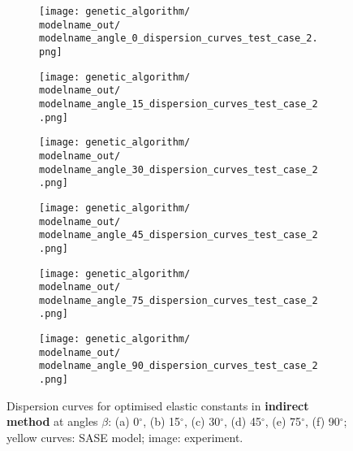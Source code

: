 \documentclass[preprint,12pt]{elsarticle}
\begin{document}
\begin{figure} [h!]
	\newcommand{\modelname}{ga_plain_weave_known_mass}
	\centering
	\begin{subfigure}[b]{0.49\textwidth}
		\centering
			
\texttt{[image: genetic\_algorithm/\\modelname\_out/\\modelname\_angle\_0\_dispersion\_curves\_test\_case\_2.png]}
		\caption{}
		\label{fig:dispersion0deg}
	\end{subfigure}
	\begin{subfigure}[b]{0.49\textwidth}
		\centering
		
\texttt{[image: genetic\_algorithm/\\modelname\_out/\\modelname\_angle\_15\_dispersion\_curves\_test\_case\_2.png]}
		\caption{}
		\label{fig:dispersion15deg}
	\end{subfigure}
   \begin{subfigure}[b]{0.49\textwidth}
	   	\centering
	   	
\texttt{[image: genetic\_algorithm/\\modelname\_out/\\modelname\_angle\_30\_dispersion\_curves\_test\_case\_2.png]}
	   	\caption{}
	   	\label{fig:dispersion30deg}
   \end{subfigure}
	\begin{subfigure}[b]{0.49\textwidth}
		\centering
		
\texttt{[image: genetic\_algorithm/\\modelname\_out/\\modelname\_angle\_45\_dispersion\_curves\_test\_case\_2.png]}
		\caption{}
		\label{fig:dispersion45deg}
	\end{subfigure}
	\begin{subfigure}[b]{0.49\textwidth}
		\centering
		
\texttt{[image: genetic\_algorithm/\\modelname\_out/\\modelname\_angle\_75\_dispersion\_curves\_test\_case\_2.png]}
		\caption{}
		\label{fig:dispersion75deg}
	\end{subfigure}
    \begin{subfigure}[b]{0.49\textwidth}
    	\centering
    	
\texttt{[image: genetic\_algorithm/\\modelname\_out/\\modelname\_angle\_90\_dispersion\_curves\_test\_case\_2.png]}
    	\caption{}
    	\label{fig:dispersion90deg}
    \end{subfigure}
	\caption{Dispersion curves for optimised elastic constants in \textbf{indirect method} 
	at angles \(\beta\): (a) 0\(^{\circ}\), (b) 15\(^{\circ}\), (c) 30\(^{\circ}\), (d) 
	45\(^{\circ}\), 
	(e) 
	75\(^{\circ}\), (f) 90\(^{\circ}\); yellow curves: SASE model; image: experiment. }
	\label{fig:optimized}
\end{figure}
\end{document}
